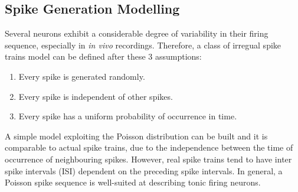 \subsection{Spike Generation Modelling}
Several neurons exhibit a considerable degree of variability in their firing
sequence, especially in \textit{in vivo} recordings. Therefore, a class of irregual
spike trains model can be defined after these 3 assumptions:
\begin{enumerate}
    \item Every spike is generated randomly.
    \item Every spike is independent of other spikes.
    \item Every spike has a uniform probability of occurrence in time.
\end{enumerate}
A simple model exploiting the Poisson distribution can be built and it is comparable
to actual spike trains, due to the independence between the time of occurrence of
neighbouring spikes. However, real spike trains tend to have inter spike intervals
(ISI) dependent on the preceding spike intervals.
In general, a Poisson spike sequence is well-suited at describing tonic firing
neurons.
